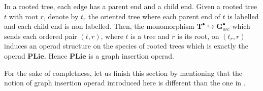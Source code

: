 \documentclass[a4paper]{article}
\theoremstyle{definition}
\newcommand{\K}{\mathbb{K}}
\newcommand{\PLie}{\mathbf{PLie}}
\newcommand{\G}{\mathbf{G}}
\newcommand{\T}{\mathbf{T}}
\begin{document}
In a rooted tree, each edge has a parent end and a child end. Given a rooted tree $t$ with
root $r$, denote by $t_r$ the oriented tree where each parent end of $t$ is labelled and
each child end is non labelled. Then, the monomorphism $\T^{\bullet}\hookrightarrow
\G_{orc}^{\bullet}$ which sends each ordered pair $(t,r)$, where $t$ is a tree and $r$ is
its root, on $(t_r,r)$ induces an operad structure on the species of rooted trees which is
exactly the operad $\PLie$. Hence $\PLie$ is a graph insertion operad.

For the sake of completness, let us finish this section by mentioning 
that the notion of graph insertion operad introduced here is different 
than the one in \cite{Kreimer:2000ja}.

\end{document}
